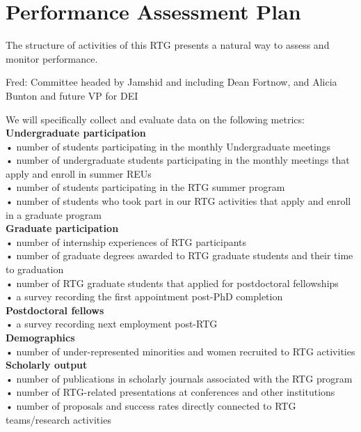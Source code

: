\documentclass[11pt]{NSFamsart}
\newcommand{\FredNote}[1]{{\color{blue} Fred: #1}}
\begin{document}
\section{Performance Assessment Plan  }
 
The structure  of activities of this RTG presents a natural way to assess and monitor performance.  

\FredNote{Committee headed by Jamshid and including Dean Fortnow, and Alicia Bunton and future VP for DEI }


We will specifically collect and evaluate data on the following metrics:\\

\noindent
\textbf{Undergraduate participation}\\
• number of students participating in the monthly Undergraduate meetings\\
• number of undergraduate students participating in the monthly meetings that apply and enroll in summer REUs\\
• number of students participating in the RTG summer  program\\
• number of students who took part in our RTG activities that apply and enroll in a graduate program\\

\noindent
\textbf{Graduate participation}\\
• number of internship experiences of RTG participants\\
• number of graduate degrees awarded to RTG graduate students and their time to graduation\\
• number of RTG graduate students that applied for postdoctoral fellowships\\
• a survey recording the first appointment post-PhD completion\\

\noindent
\textbf{Postdoctoral fellows}\\
• a survey recording next employment post-RTG     \\

\noindent
\textbf{Demographics}\\
• number of under-represented minorities and women recruited to   RTG activities \\

\noindent
\textbf{Scholarly output}\\
• number of publications in scholarly journals associated with the RTG program\\
• number of RTG-related presentations at conferences and other institutions\\
• number of proposals and success rates directly connected to RTG teams/research activities
\end{document}
